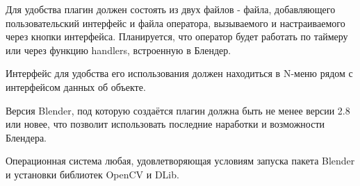 
Для удобства плагин должен состоять из двух файлов - файла, добавляющего пользовательский интерфейс и файла оператора, вызываемого и настраиваемого через кнопки интерфейса. Планируется, что оператор будет работать по таймеру или через функцию handlers, встроенную в Блендер.

Интерфейс для удобства его использования должен находиться в N-меню рядом с интерфейсом данных об объекте.

Версия Blender, под которую создаётся плагин должна быть не менее версии 2.8 или новее, что позволит использовать последние наработки и возможности Блендера.

Операционная система любая, удовлетворяющая условиям запуска пакета Blender и установки библиотек OpenCV и DLib.

\clearpage

